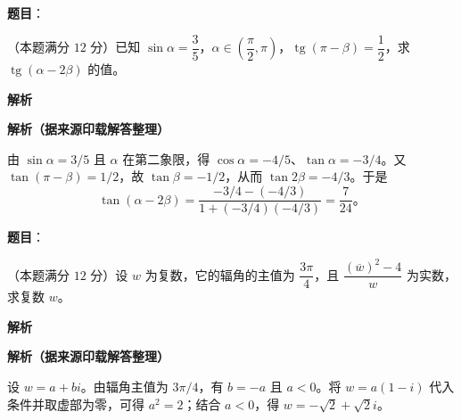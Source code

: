 \begin{answer}

\textbf{题目}：

（本题满分 $12$ 分）已知 $\sin\alpha=\dfrac35$，$\alpha\in\left(\dfrac\pi2,\pi\right)$，$\operatorname{tg}(\pi-\beta)=\dfrac12$，求 $\operatorname{tg}(\alpha-2\beta)$ 的值。

\textbf{解析}

\textbf{解析（据来源印载解答整理）}

由 $\sin\alpha=3/5$ 且 $\alpha$ 在第二象限，得 $\cos\alpha=-4/5$、$\tan\alpha=-3/4$。又 $\tan(\pi-\beta)=1/2$，故 $\tan\beta=-1/2$，从而 $\tan2\beta=-4/3$。于是
\nopagebreak[4]
\[
\tan(\alpha-2\beta)=\frac{-3/4-(-4/3)}{1+(-3/4)(-4/3)}=\frac7{24}\mbox{。}
\]


\end{answer}
\begin{answer}

\textbf{题目}：

（本题满分 $12$ 分）设 $w$ 为复数，它的辐角的主值为 $\dfrac{3\pi}4$，且 $\dfrac{(\overline w)^2-4}{w}$ 为实数，求复数 $w$。

\textbf{解析}

\textbf{解析（据来源印载解答整理）}

设 $w=a+bi$。由辐角主值为 $3\pi/4$，有 $b=-a$ 且 $a<0$。将 $w=a(1-i)$ 代入条件并取虚部为零，可得 $a^2=2$；结合 $a<0$，得 $w=-\sqrt2+\sqrt2 i$。


\end{answer}
